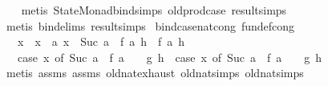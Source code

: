 \begin{isabellebody}
\ \ \isamarkupfalse%
\ {\isacharparenleft}{\kern0pt}metis\ StateMonad{\isachardot}{\kern0pt}bind{\isachardot}{\kern0pt}simps\ old{\isachardot}{\kern0pt}prod{\isachardot}{\kern0pt}case\ result{\isachardot}{\kern0pt}simps{\isacharparenleft}{\kern0pt}{}{\isacharparenright}{\kern0pt}{\isacharparenright}{\kern0pt}\isanewline
\ \ \isamarkupfalse%
\ {\isacharparenleft}{\kern0pt}metis\ bind{\isachardot}{\kern0pt}elims\ result{\isachardot}{\kern0pt}simps{\isacharparenleft}{\kern0pt}{}{\isacharparenright}{\kern0pt}{\isacharparenright}{\kern0pt}%
\endisatagproof
{\isafoldproof}%
%
\isadelimproof
\isanewline
%
\endisadelimproof
\isanewline
\isanewline
{}\isamarkupfalse%
\ bind{\isacharunderscore}{\kern0pt}case{\isacharunderscore}{\kern0pt}nat{\isacharunderscore}{\kern0pt}cong\ {\isacharbrackleft}{\kern0pt}fundef{\isacharunderscore}{\kern0pt}cong{\isacharbrackright}{\kern0pt}{\isacharcolon}{\kern0pt}\isanewline
\ \ \ {\isachardoublequoteopen}x\ {\isacharequal}{\kern0pt}\ x{\isacharprime}{\kern0pt}{\isachardoublequoteclose}\ \ {\isachardoublequoteopen}{\isasymAnd}a{\isachardot}{\kern0pt}\ x\ {\isacharequal}{\kern0pt}\ Suc\ a\ {\isasymLongrightarrow}\ f\ a\ h\ {\isacharequal}{\kern0pt}\ f{\isacharprime}{\kern0pt}\ a\ h{\isachardoublequoteclose}\isanewline
\ \ \ {\isachardoublequoteopen}{\isacharparenleft}{\kern0pt}case\ x\ of\ Suc\ a\ {\isasymRightarrow}\ f\ a\ {\isacharbar}{\kern0pt}\ {}\ {\isasymRightarrow}\ g{\isacharparenright}{\kern0pt}\ h\ {\isacharequal}{\kern0pt}\ {\isacharparenleft}{\kern0pt}case\ x{\isacharprime}{\kern0pt}\ of\ Suc\ a\ {\isasymRightarrow}\ f{\isacharprime}{\kern0pt}\ a\ {\isacharbar}{\kern0pt}\ {}\ {\isasymRightarrow}\ g{\isacharparenright}{\kern0pt}\ h{\isachardoublequoteclose}\isanewline
%
\isadelimproof
\ \ %
\endisadelimproof
%
\isatagproof
{}\isamarkupfalse%
\ {\isacharparenleft}{\kern0pt}metis\ assms{\isacharparenleft}{\kern0pt}{}{\isacharparenright}{\kern0pt}\ assms{\isacharparenleft}{\kern0pt}{}{\isacharparenright}{\kern0pt}\ old{\isachardot}{\kern0pt}nat{\isachardot}{\kern0pt}exhaust\ old{\isachardot}{\kern0pt}nat{\isachardot}{\kern0pt}simps{\isacharparenleft}{\kern0pt}{}{\isacharparenright}{\kern0pt}\ old{\isachardot}{\kern0pt}nat{\isachardot}{\kern0pt}simps{\isacharparenleft}{\kern0pt}{}{\isacharparenright}{\kern0pt}{\isacharparenright}{\kern0pt}%
\endisatagproof
{\isafoldproof}%
%
\isadelimproof
\isanewline
%
\endisadelimproof

\end{isabellebody}

